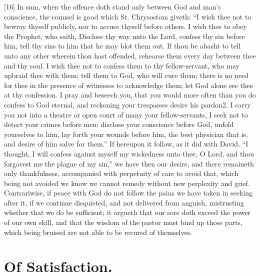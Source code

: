 [16] In sum, when the offence doth stand only between God and man’s conscience, the counsel is good which St. Chrysostom giveth: “I wish thee not to bewray thyself publicly, nor to accuse thyself before others. I wish thee to obey the Prophet, who saith, Disclose thy way unto the Lord, confess thy sin before him, tell thy sins to him that he may blot them out. If thou be abasht to tell unto any other wherein thou hast offended, rehearse them every day between thee and thy soul. I wish thee not to confess them to thy fellow-servant, who may upbraid thee with them; tell them to God, who will cure them; there is no need for thee in the presence of witnesses to acknowledge them; let God alone see thee at thy confession. I pray and beseech you, that you would more often than you do confess to God eternal, and reckoning your trespasses desire his pardon2. I carry you not into a theatre or open court of many your fellow-servants, I seek not to detect your crimes before men; disclose your conscience before God, unfold yourselves to him, lay forth your wounds before him, the best physician that is, and desire of him salve for them.” If hereupon it follow, as it did with David, “I thought, I will confess against myself my wickedness unto thee, O Lord, and thou forgavest me the plague of my sin,” we have then our desire, and there  remaineth only thankfulness, accompanied with perpetuity of care to avoid that, which being not avoided we know we cannot remedy without new perplexity and grief. Contrariwise, if peace with God do not follow the pains we have taken in seeking after it, if we continue disquieted, and not delivered from anguish, mistrusting whether that we do be sufficient; it argueth that our sore doth exceed the power of our own skill, and that the wisdom of the pastor must bind up those parts, which being bruised are not able to be recured of themselves.

\section*{Of Satisfaction.}

